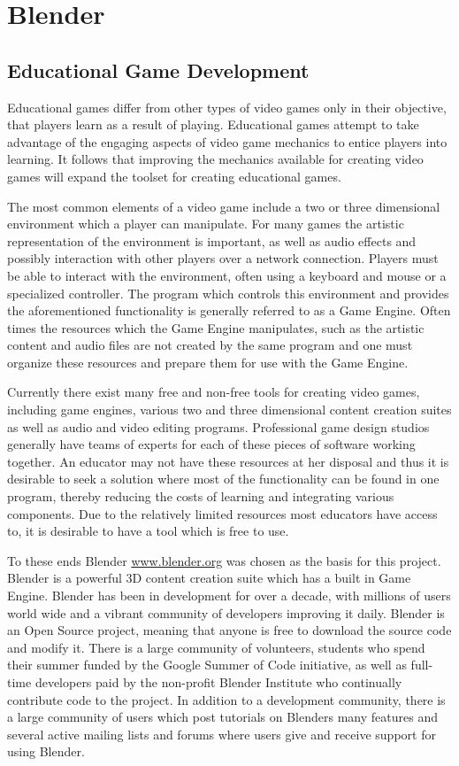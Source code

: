 \chapter{Blender}

\section{Educational Game Development}
Educational games differ from other types of video games only in their
objective, that players learn as a result of playing. Educational games attempt
to take advantage of the engaging aspects of video game mechanics to entice
players into learning. It follows that improving the mechanics available for
creating video games will expand the toolset for creating educational games.


The most common elements of a video game include a two or three dimensional
environment which a player can manipulate. For many games the artistic
representation of the environment is important, as well as audio effects and
possibly interaction with other players over a network connection. Players must
be able to interact with the environment, often using a keyboard and mouse or a
specialized controller. The program which controls this environment and
provides the aforementioned functionality is generally referred to as a Game
Engine. Often times the resources which the Game Engine manipulates, such as
the artistic content and audio files are not created by the same program and
one must organize these resources and prepare them for use with the Game
Engine.


Currently there exist many free and non-free tools for creating video games,
including game engines, various two and three dimensional content creation
suites as well as audio and video editing programs. Professional game design
studios generally have teams of experts for each of these pieces of software
working together. An educator may not have these resources at her disposal and
thus it is desirable to seek a solution where most of the functionality can be
found in one program, thereby reducing the costs of learning and integrating
various components. Due to the relatively limited resources most educators have
access to, it is desirable to have a tool which is free to use. 


To these ends Blender \url{www.blender.org} was chosen as the basis for this project.
Blender is a powerful 3D content creation suite which has a built in Game
Engine. Blender has been in development for over a decade, with millions of
users world wide and a vibrant community of developers improving it daily.
Blender is an Open Source project, meaning that anyone is free to download the
source code and modify it. There is a large community of volunteers, students
who spend their summer funded by the Google Summer of Code initiative, as well
as full-time developers paid by the non-profit Blender Institute who
continually contribute code to the project. In addition to a development
community, there is a large community of users which post tutorials on Blenders
many features and several active mailing lists and forums where users give and
receive support for using Blender.



